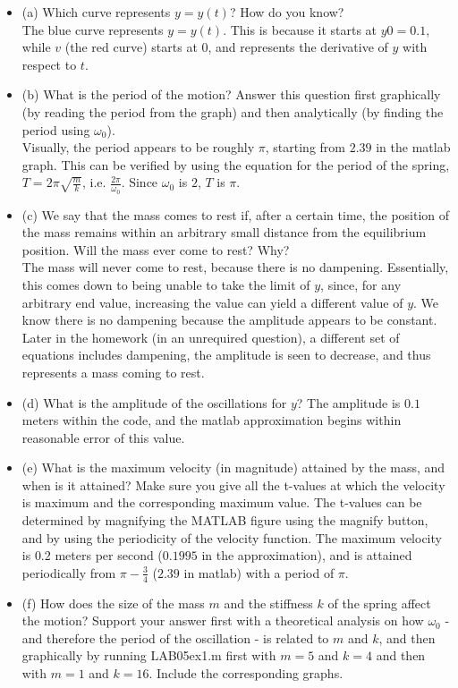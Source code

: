 \solution
\begin{itemize}

\item (a) Which curve represents $y = y(t)$? How do you know? \\ 
    The blue curve represents $y = y(t)$. This is because it starts at $y0 = 0.1$, while $v$ (the red curve) starts at $0$, and represents the derivative of $y$ with respect to $t$.
\item (b) What is the period of the motion? Answer this question first graphically (by reading the period from the graph) and then analytically (by finding the period using $\omega_0$). \\
    Visually, the period appears to be roughly $\pi$, starting from $2.39$ in the matlab graph. This can be verified by using the equation for the period of the spring, $T=2\pi \sqrt{\frac{m}{k}}$, i.e. $\frac{2\pi}{\omega_0}$. Since $\omega_0$ is $2$, $T$ is $\pi$.
\item (c) We say that the mass comes to rest if, after a certain time, the position of the mass remains within an arbitrary small distance from the equilibrium position. Will the mass ever come to
rest? Why? \\
The mass will never come to rest, because there is no dampening. Essentially, this comes down to being unable to take the limit of $y$, since, for any arbitrary end value, increasing the value can yield a different value of $y$. We know there is no dampening because the amplitude appears to be constant. Later in the homework (in an unrequired question), a different set of equations includes dampening, the amplitude is seen to decrease, and thus represents a mass coming to rest.
\item (d) What is the amplitude of the oscillations for $y$?
    The amplitude is $0.1$ meters within the code, and the matlab approximation begins within reasonable error of this value.
\item (e) What is the maximum velocity (in magnitude) attained by the mass, and when is it attained?  Make sure you give all the t-values at which the velocity is maximum and the corresponding maximum value. The t-values can be determined by magnifying the MATLAB figure using the magnify button, and by using the periodicity of the velocity function.
    The maximum velocity is $0.2$ meters per second ($0.1995$ in the approximation), and is attained periodically from $\pi - \frac{3}{4}$ ($2.39$ in matlab) with a period of $\pi$.
\item (f) How does the size of the mass $m$ and the stiffness $k$ of the spring affect the motion?  Support your answer first with a theoretical analysis on how $\omega_0$ - and therefore the period of the oscillation - is related to $m$ and $k$, and then graphically by running LAB05ex1.m first with $m = 5$ and $k = 4$ and then with $m = 1$ and $k = 16$. Include the corresponding graphs. \\

\end{itemize}
